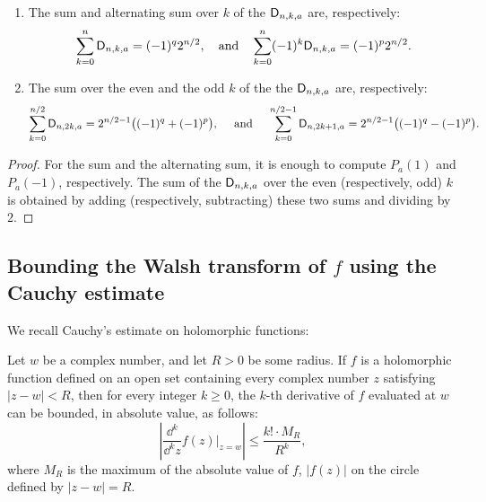 \documentclass[11pt]{llncs}
\begin{document}
\begin{proposition}\mbox{}
    \begin{enumerate}
        \item The sum and alternating sum over $k$ of the $\mathsf{D}_{n,k,a}$ are, respectively:
\[
 \sum_{k=0}^n\mathsf{D}_{n,k,a}=(-1)^{q}2^{n/2}, \quad \text{and} \quad
 \sum_{k=0}^n(-1)^k\mathsf{D}_{n,k,a}=(-1)^{p}2^{n/2}.
\]
        \item The sum over the even and the odd $k$ of the the $\mathsf{D}_{n,k,a}$ are, respectively:
\[
\sum_{k=0}^{n/2}\mathsf{D}_{n,2k,a}=2^{n/2-1}\big((-1)^{q}+(-1)^{p}\big), \quad \text{ and } \quad 
\sum_{k=0}^{n/2-1}\mathsf{D}_{n,2k+1,a}=2^{n/2-1}\big((-1)^{q}-(-1)^{p}\big).
\]
    
    \end{enumerate}

\end{proposition}

\begin{proof}
	For the sum and the alternating sum, it is enough to compute $P_a(1)$ and $P_a(-1)$, respectively. The sum of the $\mathsf{D}_{n,k,a}$ over the even (respectively, odd) $k$ is obtained by adding (respectively, subtracting) these two sums and dividing by $2$.
\end{proof}

\subsection{Bounding the Walsh transform of $f$ using the Cauchy estimate}\label{sec:Cauchy}


We recall Cauchy's estimate on holomorphic functions:

\begin{Prop}\label{property:cauchy_estimate}
    Let $w$ be a complex number, and let $R>0$ be some radius. If $f$ is a holomorphic function defined on an open set containing every complex number $z$ satisfying $|z-w|<R$, then for every integer $k\geq 0$, the $k$-th derivative of $f$ evaluated at $w$ can be bounded, in absolute value, as follows:
    \[
        \left|\frac{\dd^k}{\dd^k z}f(z)\vert_{z=w}\right|\leq\frac{k!\cdot M_R}{R^k},
    \]
where $M_R$ is the maximum of the absolute value of $f$, $|f(z)|$ on the circle defined by $|z-w|=R$.
\end{Prop}
\end{document}
